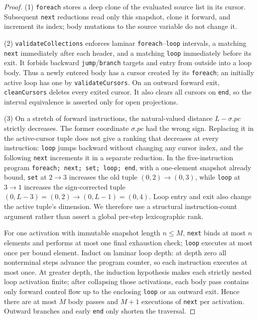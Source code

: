 \documentclass[11pt,a4paper]{article}
\theoremstyle{definition}
\theoremstyle{remark}
\begin{document}
\begin{proof}
(1) \texttt{foreach} stores a deep clone of the evaluated source list in its cursor. Subsequent \texttt{next} reductions read only this snapshot, clone it forward, and increment its index; body mutations to the source variable do not change it.

(2) \texttt{validateCollections} enforces laminar \texttt{foreach}--\texttt{loop} intervals, a matching \texttt{next} immediately after each header, and a matching \texttt{loop} immediately before its exit. It forbids backward \texttt{jump}/\texttt{branch} targets and entry from outside into a loop body. Thus a newly entered body has a cursor created by its \texttt{foreach}; an initially active loop has one by \texttt{validateCursors}. On an outward forward exit, \texttt{cleanCursors} deletes every exited cursor. It also clears all cursors on \texttt{end}, so the interval equivalence is asserted only for open projections.

(3) On a stretch of forward instructions, the natural-valued distance $L-\sigma.\mathit{pc}$ strictly decreases. The former coordinate $\sigma.\mathit{pc}$ had the wrong sign. Replacing it in the active-cursor tuple does not give a ranking that decreases at every instruction: \texttt{loop} jumps backward without changing any cursor index, and the following \texttt{next} increments it in a separate reduction. In the five-instruction program \texttt{foreach; next; set; loop; end}, with a one-element snapshot already bound, \texttt{set} at $2\to3$ increases the old tuple $(0,2)\to(0,3)$, while \texttt{loop} at $3\to1$ increases the sign-corrected tuple $(0,L-3)=(0,2)\to(0,L-1)=(0,4)$. Loop entry and exit also change the active tuple's dimension. We therefore use a structural instruction-count argument rather than assert a global per-step lexicographic rank.

For one activation with immutable snapshot length $n\le M$, \texttt{next} binds at most $n$ elements and performs at most one final exhaustion check; \texttt{loop} executes at most once per bound element. Induct on laminar loop depth: at depth zero all nonterminal steps advance the program counter, so each instruction executes at most once. At greater depth, the induction hypothesis makes each strictly nested loop activation finite; after collapsing those activations, each body pass contains only forward control flow up to the enclosing \texttt{loop} or an outward exit. Hence there are at most $M$ body passes and $M+1$ executions of \texttt{next} per activation. Outward branches and early \texttt{end} only shorten the traversal.


\end{proof}
\end{document}
